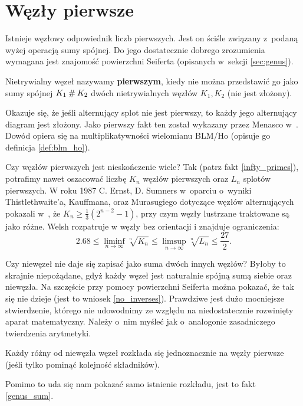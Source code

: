 \section{Węzły pierwsze}
\label{sec:prime_knots}
Istnieje węzłowy odpowiednik liczb pierwszych.
Jest on ściśle związany z~podaną wyżej operacją sumy spójnej.
Do jego dostatecznie dobrego zrozumienia wymagana jest znajomość powierzchni Seiferta (opisanych w~sekcji \ref{sec:genus}).

\begin{definition}
    \label{primeknot}
    Nietrywialny węzeł nazywamy \textbf{pierwszym},
    kiedy nie można przedstawić go jako sumy spójnej $K_1 \mathbin{\#} K_2$
    dwóch nietrywialnych węzłów $K_1, K_2$ (nie jest złożony).
\end{definition}

Okazuje się, że jeśli alternujący splot nie jest pierwszy,
to każdy jego alternujący diagram jest złożony.
Jako pierwszy fakt ten został wykazany przez Menasco w~\cite{menasco84}.
Dowód opiera się na multiplikatywności wielomianu BLM/Ho (opisuje go definicja \ref{def:blm_ho}).

Czy węzłów pierwszych jest nieskończenie wiele?
Tak (patrz fakt \ref{infty_primes}), potrafimy nawet oszacować liczbę $K_n$ węzłów pierwszych oraz $L_n$ splotów pierwszych.
W roku 1987 C. Ernst, D. Sumners w~oparciu o~wyniki Thistlethwaite'a, Kauffmana, oraz Murasugiego dotyczące węzłów alternujących pokazali w~\cite{ernst87}, że $K_n \ge \frac 1 3 (2^{n- 2} - 1)$, przy czym węzły lustrzane traktowane są jako różne.
Welsh rozpatruje w \cite{welsh92} węzły bez orientacji i znajduje ograniczenia:
\[
    2.68 \le \liminf_{n \to \infty}  \sqrt[n]{K_n} \le \limsup_{n \to \infty} \sqrt[n]{L_n} \le \frac {27}{2}.
\]


Czy niewęzeł nie daje się zapisać jako suma dwóch innych węzłów?
Byłoby to skrajnie niepożądane, gdyż każdy węzeł jest naturalnie spójną sumą siebie oraz niewęzła.
Na szczęście przy pomocy powierzchni Seiferta można pokazać, że tak się nie dzieje (jest to wniosek \ref{no_inverses}).
Prawdziwe jest dużo mocniejsze stwierdzenie,
którego nie udowodnimy ze względu na niedostatecznie rozwinięty aparat matematyczny.
Należy o~nim myśleć jak o~analogonie zasadniczego twierdzenia arytmetyki.

\begin{theorem}[Schubert, 1949]
    Każdy różny od niewęzła węzeł rozkłada się jednoznacznie na węzły pierwsze
    (jeśli tylko pominąć kolejność składników).
\end{theorem}

Pomimo to uda się nam pokazać samo istnienie rozkładu, jest to fakt \ref{genus_sum}.
